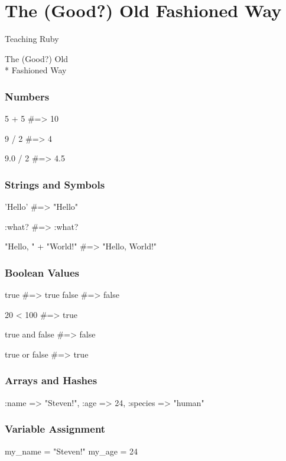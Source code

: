 \documentclass[20pt]{beamer}
\begin{document}
\section{The (Good?) Old Fashioned Way}
{
\begin{frame}
\par { Teaching Ruby}\par
\vspace{3cm}\hfill
{The (Good?) Old\\* \hfill Fashioned Way}
\end{frame}
}

\begin{frame}[fragile]
\frametitle{Numbers}
\begin{rubycode}
5 + 5 #=> 10

9 / 2 #=> 4

9.0 / 2 #=> 4.5
\end{rubycode}
\end{frame}

\begin{frame}[fragile]
\frametitle{Strings and Symbols}
\begin{rubycode}
'Hello' #=> "Hello"

:what?  #=> :what?

"Hello, " + "World!"
#=> "Hello, World!"
\end{rubycode}
\end{frame}

\begin{frame}[fragile]
\frametitle{Boolean Values}
\begin{rubycode}
true #=> true
false #=> false

20 < 100 #=> true

true and false #=> false

true or false #=> true
\end{rubycode}
\end{frame}

\begin{frame}[fragile]
\frametitle{Arrays and Hashes}
\begin{rubycode}
[ 1, 2, 3.0, "four" ]

{ :name => "Steven!",
:age => 24,
:species => "human" }
\end{rubycode}
\end{frame}

\begin{frame}[fragile]
\frametitle{Variable Assignment}
\begin{rubycode}
my_name = "Steven!"
my_age = 24
\end{rubycode}
\end{frame}
\end{document}
